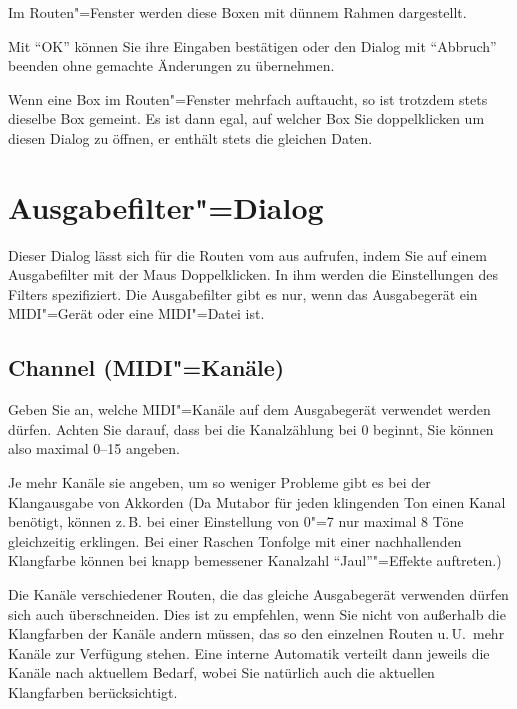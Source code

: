 {\begin{description}
  Im Routen"=Fenster werden diese Boxen mit dünnem Rahmen dargestellt.
\end{description}


Mit "`OK"' können Sie ihre Eingaben bestätigen oder den Dialog 
mit "`Abbruch"' beenden ohne gemachte Änderungen zu übernehmen.

Wenn eine Box im Routen"=Fenster mehrfach auftaucht, so ist trotzdem
stets dieselbe Box gemeint. Es ist dann egal, auf welcher Box Sie
doppelklicken um diesen Dialog zu öffnen, er enthält stets die
gleichen Daten.

\section{Ausgabefilter"=Dialog}\label{sec:DE_R3}
Dieser Dialog lässt sich für die Routen vom  
aus aufrufen, indem Sie auf einem Ausgabefilter mit der Maus 
Doppelklicken. In ihm werden die Einstellungen des Filters spezifiziert. 
Die Ausgabefilter gibt es nur, wenn das Ausgabegerät ein MIDI"=Gerät 
oder eine MIDI"=Datei ist.

\subsection{Channel (MIDI"=Kanäle)}
Geben Sie an, welche MIDI"=Kanäle auf dem Ausgabegerät verwendet 
werden dürfen. Achten Sie darauf, dass bei \mutabor{} die 
Kanalzählung bei 0 beginnt, Sie können also maximal 0--15 
angeben.

Je mehr Kanäle sie angeben, um so weniger Probleme gibt es bei der
Klangausgabe von Akkorden (Da Mutabor für jeden klingenden Ton einen
Kanal benötigt, können z.\,B. bei einer Einstellung von 0"=7 nur maximal
8 Töne gleichzeitig erklingen. Bei einer Raschen Tonfolge mit einer
nachhallenden Klangfarbe können bei knapp bemessener Kanalzahl
"`Jaul"'"=Effekte auftreten.)

Die Kanäle verschiedener Routen, die das gleiche Ausgabegerät 
verwenden dürfen sich auch überschneiden. Dies ist zu empfehlen, 
wenn Sie nicht von außerhalb die Klangfarben der Kanäle andern 
müssen, das so den einzelnen Routen u.\,U.\ mehr Kanäle zur 
Verfügung stehen. Eine interne Automatik verteilt dann jeweils 
die Kanäle nach aktuellem Bedarf, wobei Sie natürlich auch 
die aktuellen Klangfarben berücksichtigt.

}
